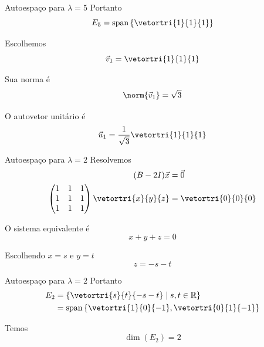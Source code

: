 \begin{resolution}{Autoespaço para $\lambda=5$}
  Portanto
  \[
      E_{5}=
      \operatorname{span}
      \left\{
          \vetortri{1}{1}{1}
      \right\}
  \]

  Escolhemos
  \[
      \vec{v}_{1}=\vetortri{1}{1}{1}
  \]

  Sua norma é
  \[
      \norm{\vec{v}_{1}}=\sqrt{3}
  \]

  O autovetor unitário é
  \[
      \vec{u}_{1}=
      \frac{1}{\sqrt{3}}
      \vetortri{1}{1}{1}
  \]
\end{resolution}

\begin{resolution}{Autoespaço para $\lambda=2$}
  Resolvemos
  \begin{align*}
      (B-2I)\vec{x}&=\vec{0}\\
      \begin{pmatrix}
          1 & 1 & 1\\
          1 & 1 & 1\\
          1 & 1 & 1
      \end{pmatrix}
      \vetortri{x}{y}{z}
      &=\vetortri{0}{0}{0}
  \end{align*}

  O sistema equivalente é
  \[
      x+y+z=0
  \]

  Escolhendo $x=s$ e $y=t$
  \[
      z=-s-t
  \]
\end{resolution}

\begin{resolution}{Autoespaço para $\lambda=2$}
  Portanto
  \begin{align*}
      E_{2}
      &=
      \left\{
          \vetortri{s}{t}{-s-t}
          \mid s,t\in\mathbb{R}
      \right\}\\
      &=
      \operatorname{span}
      \left\{
          \vetortri{1}{0}{-1}
          ,
          \vetortri{0}{1}{-1}
      \right\}
  \end{align*}

  Temos
  \[
      \dim(E_{2})=2
  \]
\end{resolution}

